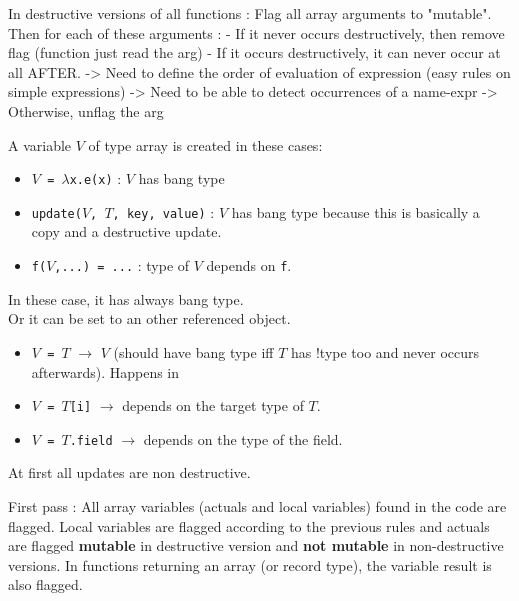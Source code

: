 \documentclass[12pt,a4paper]{article}
\newcommand{\cl}[1]{\texttt{#1}}
\begin{document}
In destructive versions of all functions :
Flag all array arguments to "mutable".
Then for each of these arguments :
  - If it never occurs destructively, then remove flag
          (function just read the arg)
  - If it occurs destructively, it can never occur at all AFTER.
  -> Need to define the order of evaluation of expression
      (easy rules on simple expressions)
  -> Need to be able to detect occurrences of a name-expr
  -> Otherwise, unflag the arg

A variable $V$ of type array is created in these cases:
\begin{itemize}
\item \cl{$V$ = $\lambda$x.e(x)} : $V$ has bang type
\item \cl{update($V$, $T$, key, value)} : $V$ has bang type because this is basically a copy and a destructive update.
\item \cl{f($V$,...) = ...} : type of $V$ depends on \cl{f}.
\end{itemize}
In these case, it has always bang type.\\
Or it can be set to an other referenced object.
\begin{itemize}
\item \cl{$V$ = $T$} $\rightarrow$ $V$ (should have bang type iff $T$ has !type too and never occurs afterwards). Happens in 
\item \cl{$V$ = $T$[i]} $\rightarrow$ depends on the target type of $T$.
\item \cl{$V$ = $T$.field} $\rightarrow$ depends on the type of the field.
\end{itemize}
At first all updates are non destructive.

First pass : All array variables (actuals and local variables) found in the code are flagged. Local variables are flagged according to the previous rules and actuals are flagged \textbf{mutable} in destructive version and \textbf{not mutable} in non-destructive versions. In functions returning an array (or record type), the variable result is also flagged.\\
\end{document}

